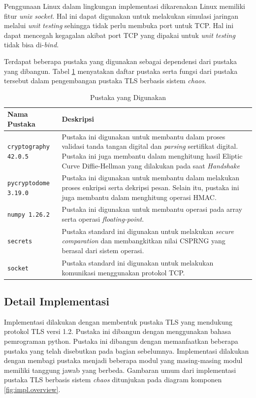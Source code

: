Penggunaan Linux dalam lingkungan implementasi dikarenakan Linux memiliki fitur \emph{unix socket}. Hal ini dapat digunakan untuk melakukan simulasi jaringan melalui \emph{unit testing} sehingga tidak perlu membuka port untuk TCP. Hal ini dapat mencegah kegagalan akibat port TCP yang dipakai untuk \emph{unit testing} tidak bisa di-\emph{bind}.

Terdapat beberapa pustaka yang digunakan sebagai dependensi dari pustaka yang dibangun. Tabel \ref{tab:impl.lib} menyatakan daftar pustaka serta fungsi dari pustaka tersebut dalam pengembangan pustaka TLS berbasis sistem \emph{chaos}.

\begin{table}[!h]
  \centering
  \caption{Pustaka yang Digunakan} \label{tab:impl.lib}
  \begin{tabular}{|p{4cm}|p{9cm}|}
    \hline
    Nama Pustaka & Deskripsi \\ \hline
    \texttt{cryptography 42.0.5} & Pustaka ini digunakan untuk membantu dalam proses validasi tanda tangan digital dan \emph{parsing} sertifikat digital. Pustaka ini juga membantu dalam menghitung hasil Eliptic Curve Diffie-Hellman yang dilakukan pada saat \emph{Handshake} \\ \hline
    \texttt{pycryptodome 3.19.0} & Pustaka ini digunakan untuk membantu dalam melakukan proses enkripsi serta dekripsi pesan. Selain itu, pustaka ini juga membantu dalam menghitung operasi HMAC. \\ \hline
    \texttt{numpy 1.26.2} & Pustaka ini digunakan untuk membantu operasi pada array serta operasi \emph{floating-point}.\\ \hline
    \texttt{secrets} & Pustaka standard ini digunakan untuk melakukan \emph{secure comparation} dan membangkitkan nilai CSPRNG yang berasal dari sistem operasi. \\ \hline
    \texttt{socket} & Pustaka standard ini digunakan untuk melakukan komunikasi menggunakan protokol TCP.\\ \hline
  \end{tabular}
\end{table}

\subsection{Detail Implementasi}

Implementasi dilakukan dengan membentuk pustaka TLS yang mendukung protokol TLS versi 1.2. Pustaka ini dibangun dengan menggunakan bahasa pemrograman python. Pustaka ini dibangun dengan memanfaatkan beberapa pustaka yang telah disebutkan pada bagian sebelumnya. Implementasi dilakukan dengan membagi pustaka menjadi beberapa modul yang masing-masing modul memiliki tanggung jawab yang berbeda. Gambaran umum dari implementasi pustaka TLS berbasis sistem \emph{chaos} ditunjukan pada diagram komponen \ref{fig:impl.overview}.

